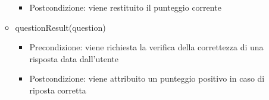 \begin{itemize}
\begin{itemize}
\begin{itemize}
	\item{Postcondizione: viene restituito il punteggio corrente}
\end{itemize}
\item questionResult(question)
\begin{itemize}
	\item{Precondizione: viene richiesta la verifica della correttezza di una risposta data dall'utente}
	\item{Postcondizione: viene attribuito un punteggio positivo in caso di riposta corretta}
\end{itemize}
 	\end{itemize}
 \end{itemize}